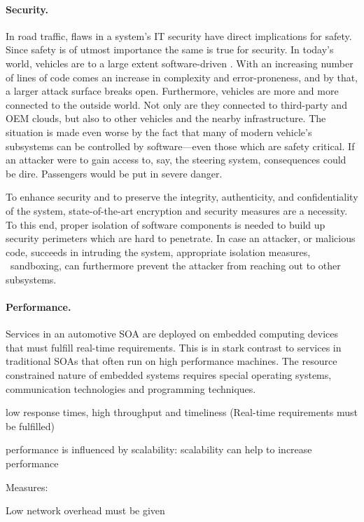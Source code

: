 \paragraph{Security.}
In road traffic, flaws in a system's IT security have direct implications for safety. Since safety is of utmost importance the same is true for security. In today's world, vehicles are to a large extent software-driven \cite{broy2006challenges}. With an increasing number of lines of code comes an increase in complexity and error-proneness, and by that, a larger attack surface breaks open. Furthermore, vehicles are more and more connected to the outside world. Not only are they connected to third-party and OEM clouds, but also to other vehicles and the nearby infrastructure. The situation is made even worse by the fact that many of modern vehicle's subsystems can be controlled by software---even those which are safety critical.	 If an attacker were to gain access to, say, the steering system, consequences could be dire. Passengers would be put in severe danger.

To enhance security and to preserve the integrity, authenticity, and confidentiality of the system, state-of-the-art encryption and security measures are a necessity. To this end, proper isolation of software components is needed to build up security perimeters which are hard to penetrate. In case an attacker, or malicious code, succeeds in intruding the system, appropriate isolation measures, \ie\ sandboxing, can furthermore prevent the attacker from reaching out to other subsystems.


\paragraph{Performance.}
Services in an automotive SOA are deployed on embedded computing devices that must fulfill real-time requirements. This is in stark contrast to services in traditional SOAs that often run on high performance machines. The resource constrained nature of embedded systems requires special operating systems, communication technologies and programming techniques.

low response times, high throughput and timeliness (Real-time requirements must be fulfilled)

performance is influenced by scalability: scalability can help to increase performance

Measures:

Low network overhead must be given

